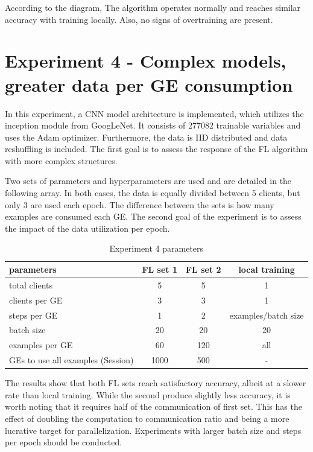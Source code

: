 According to the diagram, The algorithm operates normally and reaches similar accuracy with training locally. Also, no signs of overtraining are present.

\section{Experiment 4 - Complex models, greater data per GE consumption}
In this experiment, a CNN model architecture is implemented, which utilizes the inception module from GoogLeNet. It consists of 277082 trainable variables and uses the Adam optimizer. Furthermore, the data is IID distributed and data reshuffling is included. The first goal is to assess the response of the FL algorithm with more complex structures. 

\medskip
Two sets of parameters and hyperparameters are used and are detailed in the following array. In both cases, the data is equally divided between 5 clients, but only 3 are used each epoch. The difference between the sets is how many examples are consumed each GE. The second goal of the experiment is to assess the impact of the data utilization per epoch.

\medskip
    
\begin{table}[H]
    \center
    \begin{tabular}
        {
            | l | c | c | c |
        }
        \hline
        parameters & FL set 1 & FL set 2 & local training\\\hline
        total clients & 5 & 5 & 1\\\hline
        clients per GE & 3 & 3 & 1\\\hline
        steps per GE & 1 & 2 & examples/batch size \\\hline
        batch size & 20  & 20  & 20 \\\hline
        examples per GE & 60  & 120  & all \\\hline
        GEs to use all examples (Session) & 1000  & 500  & - \\\hline
    \end{tabular}
    
    \caption{Experiment 4 parameters}
\end{table}
    
\medskip
The results show that both FL sets reach satisfactory accuracy, albeit at a slower rate than local training. While the second produce slightly less accuracy, it is worth noting that it requires half of the communication of first set. This has the effect of doubling the computation to communication ratio and being a more lucrative target for parallelization. Experiments with larger batch size and steps per epoch should be conducted.

